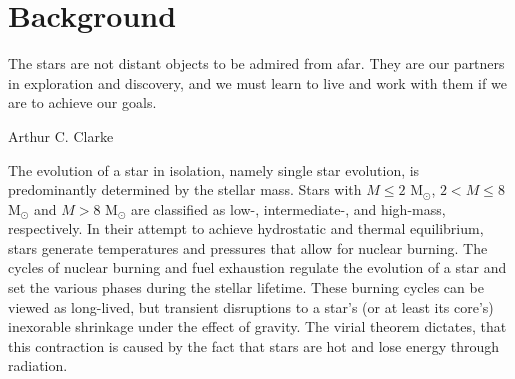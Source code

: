\chapter{Background}\label{background}

\epigraph{The stars are not distant objects to be admired from afar. They are our partners in exploration and discovery, and we must learn to live and work with them if we are to achieve our goals.}{Arthur C. Clarke}

The evolution of a star in isolation, namely single star evolution, is predominantly determined by the stellar mass. Stars with $M \leq 2$ M$_{\odot}$, $2 < M \leq 8$ M$_{\odot}$ and $M > 8$ M$_{\odot}$ are classified as low-, intermediate-, and high-mass, respectively. In their attempt to achieve hydrostatic and thermal equilibrium, stars generate temperatures and pressures that allow for nuclear burning. The cycles of nuclear burning and fuel exhaustion regulate the evolution of a star and set the various phases during the stellar lifetime. These burning cycles can be viewed as long-lived, but transient disruptions to a star's (or at least its core's) inexorable shrinkage under the effect of gravity. The virial theorem dictates, that this contraction is caused by the fact that stars are hot and lose energy through radiation. 










